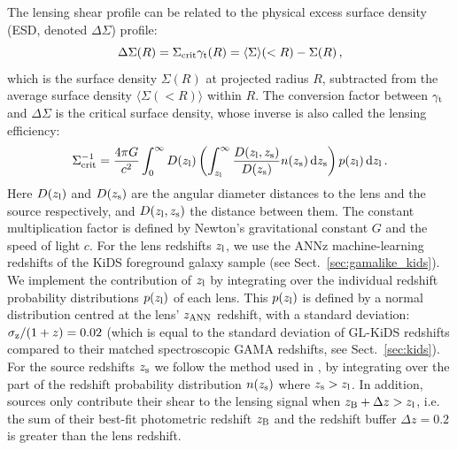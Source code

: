 \documentclass[usenatbib]{mnras}
\newcommand*{\meanb}[1]{\langle{#1}\rangle}
\newcommand{\un}[1]{_{\rm #1}}
\begin{document}
The lensing shear profile can be related to the physical excess surface density (ESD, denoted $\Delta\Sigma$) profile:
\begin{equation}
	\Delta \Sigma (R) = \Sigma\un{crit} \gamma\un{t}(R) = \meanb{\Sigma}(<R) - \Sigma(R) \, ,
	\label{eq:deltasigma}
\end{equation}
which is the surface density $\Sigma(R)$ at projected radius $R$, subtracted from the average surface density $\meanb{\Sigma(<R)}$ within $R$. The conversion factor between $\gamma\un{t}$ and $\Delta\Sigma$ is the critical surface density, whose inverse is also called the lensing efficiency:
\begin{equation}
	\Sigma\un{crit}^{-1} = \frac{4\pi G}{c^2} \int_{0}^{\infty} D(z\un{l}) \left( \int_{z\un{l}}^{\infty}  \frac{D(z\un{l}, z\un{s})}{D(z\un{s})} n(z\un{s}) \, {\rm d} z\un{s} \right) p(z\un{l}) \, {\rm d} z\un{l} \, .
	\label{eq:sigmacrit}
\end{equation}
Here $D(z\un{l})$ and $D(z\un{s})$ are the angular diameter distances to the lens and the source respectively, and $D(z\un{l}, z\un{s})$ the distance between them. The constant multiplication factor is defined by Newton's gravitational constant $G$ and the speed of light $c$. For the lens redshifts $z\un{l}$, we use the ANNz machine-learning redshifts of the KiDS foreground galaxy sample (see Sect.~\ref{sec:gamalike_kids}). We implement the contribution of $z\un{l}$ by integrating over the individual redshift probability distributions $p(z\un{l})$ of each lens. This $p(z\un{l})$ is defined by a normal distribution centred at the lens' $z\un{ANN}$ redshift, with a standard deviation: $\sigma\un{z}/(1+z) = 0.02$ (which is equal to the standard deviation of GL-KiDS redshifts compared to their matched spectroscopic GAMA redshifts, see Sect.~\ref{sec:kids}). For the source redshifts $z\un{s}$ we follow the method used in \cite{dvornik2018}, by integrating over the part of the redshift probability distribution $n(z\un{s})$ where $z\un{s}>z\un{l}$. In addition, sources only contribute their shear to the lensing signal when $z\un{B}+\Delta z > z\un{l}$, i.e. the sum of their best-fit photometric redshift $z\un{B}$ and the redshift buffer $\Delta z=0.2$ is greater than the lens redshift.
\end{document}
